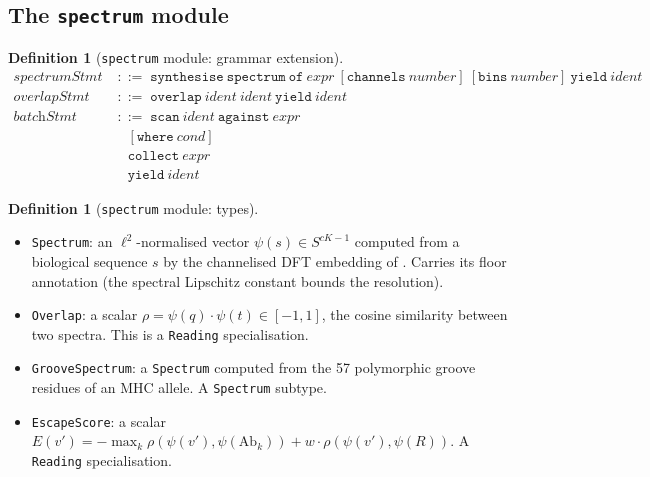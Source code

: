 \documentclass[11pt,a4paper]{article}
\theoremstyle{expthm}
\theoremstyle{definition}
\newtheorem{definition}[theorem]{Definition}
\theoremstyle{remark}
\newcommand{\cf}[1]{\texttt{#1}}
\begin{document}
\subsection{The \texttt{spectrum} module}
\label{sec:ext-spectrum}

\begin{definition}[\cf{spectrum} module: grammar extension]
\label{def:spectrum-grammar}
\begin{align*}
\textit{spectrumStmt} &\;::=\; \cf{synthesise}\ \cf{spectrum}\
  \cf{of}\ \textit{expr}\ [\cf{channels}\ \textit{number}]\
  [\cf{bins}\ \textit{number}]\ \cf{yield}\ \textit{ident}\\[2pt]
\textit{overlapStmt} &\;::=\; \cf{overlap}\ \textit{ident}\
  \textit{ident}\ \cf{yield}\ \textit{ident}\\[2pt]
\textit{batchStmt} &\;::=\; \cf{scan}\ \textit{ident}\
  \cf{against}\ \textit{expr}\\
  &\quad [\cf{where}\ \textit{cond}]\\
  &\quad \cf{collect}\ \textit{expr}\\
  &\quad \cf{yield}\ \textit{ident}
\end{align*}
\end{definition}

\begin{definition}[\cf{spectrum} module: types]
\label{def:spectrum-types}
\leavevmode
\begin{itemize}[leftmargin=1.4em,itemsep=2pt]
\item \cf{Spectrum}: an $\ell^2$-normalised vector
  $\psi(s) \in S^{cK-1}$ computed from a biological sequence $s$ by the
  channelised DFT embedding of \citep{sachikonye2026immuno}. Carries its
  floor annotation (the spectral Lipschitz constant bounds the
  resolution).
\item \cf{Overlap}: a scalar $\rho = \psi(q) \cdot \psi(t) \in [-1,1]$,
  the cosine similarity between two spectra. This is a \cf{Reading}
  specialisation.
\item \cf{GrooveSpectrum}: a \cf{Spectrum} computed from the 57
  polymorphic groove residues of an MHC allele. A \cf{Spectrum}
  subtype.
\item \cf{EscapeScore}: a scalar
  $E(v') = -\max_k \rho(\psi(v'), \psi(\mathrm{Ab}_k)) + w \cdot
  \rho(\psi(v'), \psi(R))$. A \cf{Reading} specialisation.
\end{itemize}
\end{definition}
\end{document}
